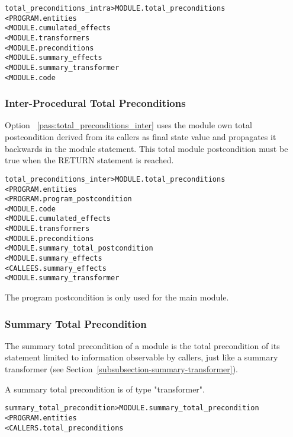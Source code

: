 \documentclass[a4paper]{report}
\newenvironment{PipsMake}{\begin{alltt}}{\end{alltt}}
\newcommand{\PipsPassRef}[1]{\texttt{\detokenize{#1}}~\ref{pass:#1}}
\newenvironment{PipsPass}[1]{\label{pass:#1}}{}
\begin{document}
\begin{PipsMake}
total_preconditions_intra            > MODULE.total_preconditions
        < PROGRAM.entities
        < MODULE.cumulated_effects
        < MODULE.transformers
        < MODULE.preconditions
        < MODULE.summary_effects
        < MODULE.summary_transformer
        < MODULE.code
\end{PipsMake}

\subsubsection{Inter-Procedural Total Preconditions}

\begin{PipsPass}{total_preconditions_inter}
Option \PipsPassRef{total_preconditions_inter} uses the module own total postcondition
derived from its callers as final state value and propagates it
backwards in the module statement. This total module postcondition must be
true when the RETURN statement is reached.
\end{PipsPass}


\begin{PipsMake}

total_preconditions_inter        > MODULE.total_preconditions
        < PROGRAM.entities
        < PROGRAM.program_postcondition
        < MODULE.code
        < MODULE.cumulated_effects
        < MODULE.transformers
        < MODULE.preconditions
        < MODULE.summary_total_postcondition
        < MODULE.summary_effects
        < CALLEES.summary_effects
        < MODULE.summary_transformer
\end{PipsMake}

The program postcondition is only used for the main module.

\subsubsection{Summary Total Precondition}

The summary total precondition of a module is the total precondition of
its statement limited to information observable by callers, just like a
summary transformer (see Section~\ref{subsubsection-summary-transformer}).

A summary total precondition is of type "transformer".

\begin{PipsMake}
summary_total_precondition            > MODULE.summary_total_precondition
        < PROGRAM.entities
        < CALLERS.total_preconditions
\end{PipsMake}
\end{document}
